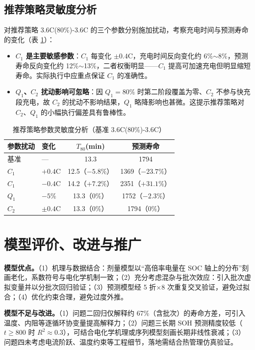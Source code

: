 \documentclass[withoutpreface]{cumcmthesis}
\begin{document}
\subsection{推荐策略灵敏度分析}

对推荐策略 3.6C(80\%)-3.6C 的三个参数分别施加扰动，考察充电时间与预测寿命的变化（表 \ref{tab:sens}）：
\begin{itemize}
\item \textbf{$C_1$ 是主要敏感参数}：$C_1$ 每变化 $\pm0.4$C，充电时间反向变化约 6\%$\sim$8\%，预测寿命反向变化约 12\%$\sim$13\%，二者权衡明显——$C_1$ 提高可加速充电但明显缩短寿命。实际执行中应重点保证 $C_1$ 的准确性。
\item \textbf{$Q_1$、$C_2$ 扰动影响可忽略}：因 $Q_1=80\%$ 时第二阶段覆盖为零、$C_2$ 不参与快充段充电，故 $C_2$ 的扰动不影响结果，$Q_1$ 略降影响也甚微。这提示推荐策略对 $C_2$、$Q_1$ 的小幅执行偏差具有鲁棒性。
\end{itemize}

\begin{table}[htbp]
\centering
\caption{推荐策略参数灵敏度分析（基准 3.6C(80\%)-3.6C）}
\label{tab:sens}
\begin{tabular}{llcc}
\toprule
参数扰动 & 变化 & $T_{80}$(min) & 预测寿命 \\
\midrule
基准 & --- & 13.3 & 1794 \\
$C_1$ & $+0.4$C & 12.5（$-5.8\%$） & 1369（$-23.7\%$） \\
$C_1$ & $-0.4$C & 14.2（$+7.2\%$） & 2351（$+31.1\%$） \\
$Q_1$ & $-5\%$ & 13.3（$0\%$） & 1752（$-2.3\%$） \\
$C_2$ & $\pm0.4$C & 13.3（$0\%$） & 1794（$0\%$） \\
\bottomrule
\end{tabular}
\end{table}

\section{模型评价、改进与推广}

\textbf{模型优点。}（1）机理与数据结合：剂量模型以“高倍率电量在 SOC 轴上的分布”刻画老化，系数符号与电化学机制一致；（2）充分考虑混杂与批次效应：引入批次虚拟变量并以分批次回归验证；（3）预测模型经 5 折$\times$8 次重复交叉验证，避免过拟合；（4）优化约束合理，避免过度外推。

\textbf{模型不足与改进。}（1）问题二回归仅解释约 67\%（含批次）的寿命方差，可引入温度、内阻等逐循环协变量提高解释力；（2）问题三长期 SOH 预测精度较低（$t\ge800$ 时 $R^2\approx0.3$），可结合电化学机理或序列模型刻画长期非线性衰减；（3）问题四未考虑电流阶跃、温度约束等工程细节，落地需结合热管理仿真验证。
\end{document}
